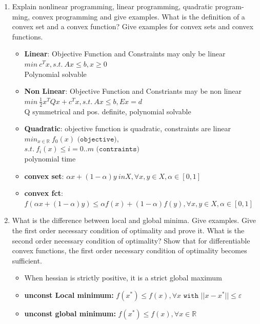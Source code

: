 \documentclass{report}
\newcommand{\question}[1]{{\small\textsf{#1}}}
\begin{document}
\begin{enumerate}
\item \question{Explain nonlinear programming, linear programming, quadratic program- ming, convex
    programming and give examples. What is the definition of a convex set and a convex function?
    Give examples for convex sets and convex functions.}
\begin{itemize}
\item \textbf{Linear}: Objective Function and Constraints may only be linear
$min\ c^Tx, s.t.\ Ax \leq b, x \geq 0$\\
Polynomial solvable
\item \textbf{Non Linear}: Objective Function and Constriants may  be non linear
$min\ \frac{1}{2} x^TQx + c^Tx, s.t.\ Ax \leq b, Ex = d$\\
Q symmetrical and pos. definite, polynomial solvable
\item \textbf{Quadratic}: objective function is quadratic, constraints are linear	
$min_{x \in \mathbb{R}}\ f_0(x) \texttt{ (objective)},$\\
$s.t.\ f_i(x) \leq i=0..m \texttt{ (contraints)}$\\
polynomial time
\item \textbf{convex set}: 
$\alpha x + (1 - \alpha)y \ in X, \forall x, y \in X, \alpha \in [0, 1]$
\item \textbf{convex fct}:
$f(\alpha x + (1 - \alpha)y) \leq \alpha f(x) + (1 - \alpha)f(y) , \forall x, y \in X, \alpha \in [0, 1]$ 
\end{itemize}
\item \question{What is the difference between local and global minima. Give examples.  Give the
    first order necessary condition of optimality and prove it. What is the second order necessary
    condition of optimality? Show that for differentiable convex functions, the first order
    necessary condition of optimality becomes sufficient.}
  \begin{itemize}
  \item When hessian is strictly positive, it is a strict global maximum
  \item \textbf{unconst Local minimum:}
    $f(x^*) \leq f(x), \forall x \texttt{ with } || x - x^* || \leq \varepsilon$
  \item \textbf{unconst global minimum:} $f(x^*) \leq f(x), \forall x \in \mathbb{R}$
  \end{itemize}


\end{enumerate}
\end{document}
